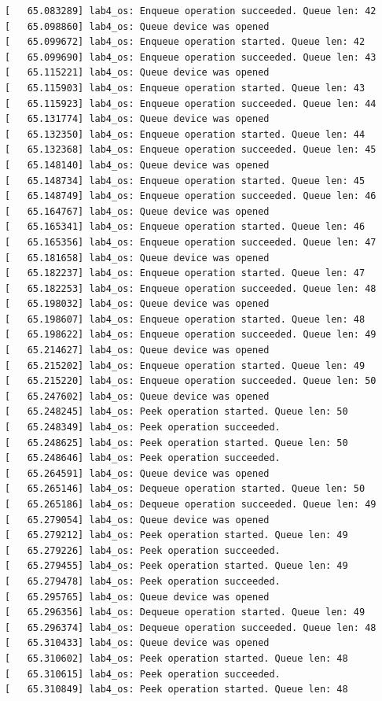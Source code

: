 \documentclass[a4paper,14pt]{extarticle}
\begin{document}
\begin{verbatim}
[   65.083289] lab4_os: Enqueue operation succeeded. Queue len: 42
[   65.098860] lab4_os: Queue device was opened
[   65.099672] lab4_os: Enqueue operation started. Queue len: 42
[   65.099690] lab4_os: Enqueue operation succeeded. Queue len: 43
[   65.115221] lab4_os: Queue device was opened
[   65.115903] lab4_os: Enqueue operation started. Queue len: 43
[   65.115923] lab4_os: Enqueue operation succeeded. Queue len: 44
[   65.131774] lab4_os: Queue device was opened
[   65.132350] lab4_os: Enqueue operation started. Queue len: 44
[   65.132368] lab4_os: Enqueue operation succeeded. Queue len: 45
[   65.148140] lab4_os: Queue device was opened
[   65.148734] lab4_os: Enqueue operation started. Queue len: 45
[   65.148749] lab4_os: Enqueue operation succeeded. Queue len: 46
[   65.164767] lab4_os: Queue device was opened
[   65.165341] lab4_os: Enqueue operation started. Queue len: 46
[   65.165356] lab4_os: Enqueue operation succeeded. Queue len: 47
[   65.181658] lab4_os: Queue device was opened
[   65.182237] lab4_os: Enqueue operation started. Queue len: 47
[   65.182253] lab4_os: Enqueue operation succeeded. Queue len: 48
[   65.198032] lab4_os: Queue device was opened
[   65.198607] lab4_os: Enqueue operation started. Queue len: 48
[   65.198622] lab4_os: Enqueue operation succeeded. Queue len: 49
[   65.214627] lab4_os: Queue device was opened
[   65.215202] lab4_os: Enqueue operation started. Queue len: 49
[   65.215220] lab4_os: Enqueue operation succeeded. Queue len: 50
[   65.247602] lab4_os: Queue device was opened
[   65.248245] lab4_os: Peek operation started. Queue len: 50
[   65.248349] lab4_os: Peek operation succeeded.
[   65.248625] lab4_os: Peek operation started. Queue len: 50
[   65.248646] lab4_os: Peek operation succeeded.
[   65.264591] lab4_os: Queue device was opened
[   65.265146] lab4_os: Dequeue operation started. Queue len: 50
[   65.265186] lab4_os: Dequeue operation succeeded. Queue len: 49
[   65.279054] lab4_os: Queue device was opened
[   65.279212] lab4_os: Peek operation started. Queue len: 49
[   65.279226] lab4_os: Peek operation succeeded.
[   65.279455] lab4_os: Peek operation started. Queue len: 49
[   65.279478] lab4_os: Peek operation succeeded.
[   65.295765] lab4_os: Queue device was opened
[   65.296356] lab4_os: Dequeue operation started. Queue len: 49
[   65.296374] lab4_os: Dequeue operation succeeded. Queue len: 48
[   65.310433] lab4_os: Queue device was opened
[   65.310602] lab4_os: Peek operation started. Queue len: 48
[   65.310615] lab4_os: Peek operation succeeded.
[   65.310849] lab4_os: Peek operation started. Queue len: 48

\end{verbatim}
\end{document}
